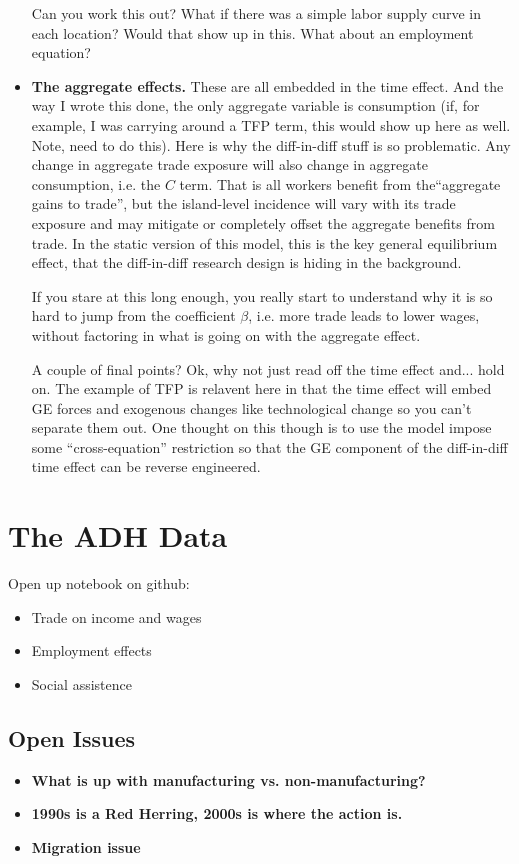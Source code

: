 \documentclass[pdftex,12pt]{article}
\begin{document}
\begin{itemize}
    Can you work this out? What if there was a simple labor supply curve in each location? Would that show up in this. What about an employment equation?

\item \textbf{The aggregate effects.} These are all embedded in the time effect. And the way I wrote this done, the only aggregate variable is consumption (if, for example, I was carrying around a TFP term, this would show up here as well. Note, need to do this). Here is why the diff-in-diff stuff is so problematic.  Any change in aggregate trade exposure will also change in aggregate consumption, i.e. the $C$ term. That is all workers benefit from the``aggregate gains to trade'', but the island-level incidence will vary with its trade exposure and may mitigate or completely offset the aggregate benefits from trade. In the static version of this model, this is the key general equilibrium effect, that the diff-in-diff research design is hiding in the background. 
    
    If you stare at this long enough, you really start to understand why it is so hard to jump from the coefficient $\beta$, i.e. more trade leads to lower wages, without factoring in what is going on with the aggregate effect. 
    
    A couple of final points? Ok, why not just read off the time effect and... hold on. The example of TFP is relavent here in that the time effect will embed GE forces and exogenous changes like technological change so you can't separate them out. One thought on this though is to use the model impose some ``cross-equation'' restriction so that the GE component of the diff-in-diff time effect can be reverse engineered. 
\end{itemize}



\newpage

\section{The ADH Data}

Open up notebook on github:

\begin{itemize}
\item Trade on income and wages

\item Employment effects

\item Social assistence
\end{itemize}


\subsection{Open Issues}

\begin{itemize}
\item \textbf{What is up with manufacturing vs. non-manufacturing?}

\item \textbf{1990s is a Red Herring, 2000s is where the action is.}

\item \textbf{Migration issue}
\end{itemize}



\small

\end{document}
